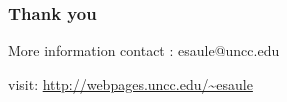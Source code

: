\documentclass[usenames,dvipsnames]{beamer}
\begin{document}
\begin{frame}
  \frametitle{Thank you}

    \begin{block}{More information}
    contact : esaule@uncc.edu
    
    visit: \url{http://webpages.uncc.edu/~esaule}
  \end{block}

\end{frame}
\end{document}
